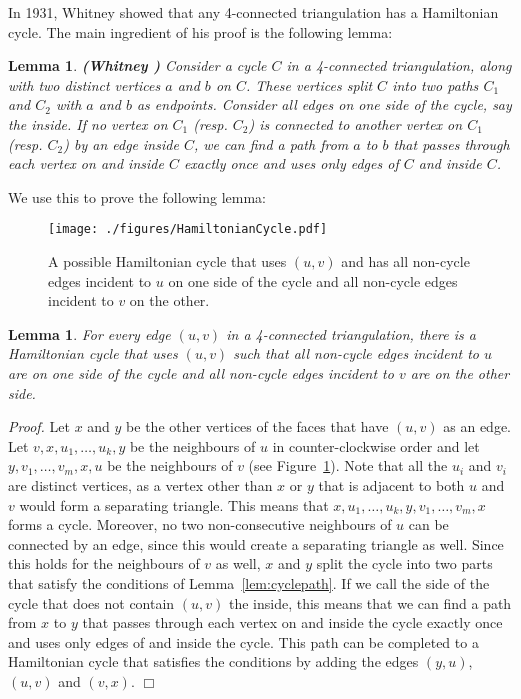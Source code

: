\pdfoutput=1 \documentclass[12pt]{elsarticle}
\newtheorem{lem}[defin]{Lemma}
\newenvironment{lemma}{\begin{lem} \sl}{\end{lem}}
\newenvironment{proof}{\emph{Proof.}}{\hfill $\Box$ \medskip\\}
\newcommand{\from}[1]{{\emph{\textbf{(#1)}}}}
\begin{document}
\noindent In 1931, Whitney \cite{whitney1931theorem} showed that any 4-connected triangulation has a Hamiltonian cycle. The main ingredient of his proof is the following lemma:

\begin{lemma}
 \label{lem:cyclepath}
 \from{Whitney \cite{whitney1931theorem}}
 Consider a cycle $C$ in a 4-connected triangulation, along with two distinct vertices $a$ and $b$ on $C$. These vertices split $C$ into two paths $C_1$ and $C_2$ with $a$ and $b$ as endpoints. Consider all edges on one side of the cycle, say the inside. If no vertex on $C_1$ (resp. $C_2$) is connected to another vertex on $C_1$ (resp. $C_2$) by an edge inside $C$, we can find a path from $a$ to $b$ that passes through each vertex on and inside $C$ exactly once and uses only edges of $C$ and inside $C$.
\end{lemma}

\noindent We use this to prove the following lemma:

\begin{figure}[ht]
 \centering
 \texttt{[image: ./figures/HamiltonianCycle.pdf]}
 \caption{A possible Hamiltonian cycle that uses $(u, v)$ and has all non-cycle edges incident to $u$ on one side of the cycle and all non-cycle edges incident to $v$ on the other.}
 \label{fig:hamiltoniancycle}
\end{figure}

\begin{lemma}
 \label{lem:goodcycle}
 For every edge $(u, v)$ in a 4-connected triangulation, there is a Hamiltonian cycle that uses $(u, v)$ such that all non-cycle edges incident to $u$ are on one side of the cycle and all non-cycle edges incident to $v$ are on the other side.
\end{lemma}
\begin{proof}
 Let $x$ and $y$ be the other vertices of the faces that have $(u, v)$ as an edge. Let $v, x, u_1, \dots , u_k, y$ be the neighbours of $u$ in counter-clockwise order and let $y, v_1, \dots , v_m, x, u$ be the neighbours of $v$ (see Figure~\ref{fig:hamiltoniancycle}). Note that all the $u_i$ and $v_i$ are distinct vertices, as a vertex other than $x$ or $y$ that is adjacent to both $u$ and $v$ would form a separating triangle. This means that $x, u_1, \dots , u_k, y, v_1, \dots , v_m, x$ forms a cycle. Moreover, no two non-consecutive neighbours of $u$ can be connected by an edge, since this would create a separating triangle as well. Since this holds for the neighbours of $v$ as well, $x$ and $y$ split the cycle into two parts that satisfy the conditions of Lemma~\ref{lem:cyclepath}. If we call the side of the cycle that does not contain $(u, v)$ the inside, this means that we can find a path from $x$ to $y$ that passes through each vertex on and inside the cycle exactly once and uses only edges of and inside the cycle. This path can be completed to a Hamiltonian cycle that satisfies the conditions by adding the edges $(y, u)$, $(u, v)$ and $(v, x)$.
\end{proof}
\end{document}
